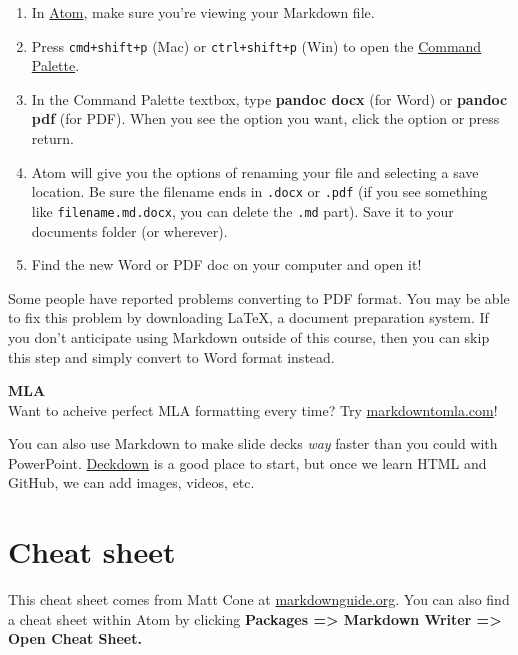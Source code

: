 \documentclass[]{book}
\providecommand{\tightlist}{%
  \setlength{\itemsep}{0pt}\setlength{\parskip}{0pt}}
\theoremstyle{definition}
\theoremstyle{definition}
\theoremstyle{definition}
\theoremstyle{remark}
\begin{document}
\begin{enumerate}
\def\labelenumi{\arabic{enumi}.}
\tightlist
\item
  In \href{https://andylaut.github.io/3844-guidebook/atom.htm}{Atom},
  make sure you're viewing your Markdown file.
\item
  Press \texttt{cmd+shift+p} (Mac) or \texttt{ctrl+shift+p} (Win) to
  open the
  \href{https://andylaut.github.io/3844-guidebook/atom.html\#command-palette}{Command
  Palette}.
\item
  In the Command Palette textbox, type \textbf{pandoc docx} (for Word)
  or \textbf{pandoc pdf} (for PDF). When you see the option you want,
  click the option or press return.
\item
  Atom will give you the options of renaming your file and selecting a
  save location. Be sure the filename ends in \texttt{.docx} or
  \texttt{.pdf} (if you see something like \texttt{filename.md.docx},
  you can delete the \texttt{.md} part). Save it to your documents
  folder (or wherever).
\item
  Find the new Word or PDF doc on your computer and open it!
\end{enumerate}

Some people have reported problems converting to PDF format. You may be
able to fix this problem by downloading LaTeX, a document preparation
system. If you don't anticipate using Markdown outside of this course,
then you can skip this step and simply convert to Word format instead.

\textbf{MLA}\\
Want to acheive perfect MLA formatting every time? Try
\href{http://markdowntomla.com/}{markdowntomla.com}!

You can also use Markdown to make slide decks \emph{way} faster than you
could with PowerPoint. \href{http://deckdown.org/}{Deckdown} is a good
place to start, but once we learn HTML and GitHub, we can add images,
videos, etc.

\hypertarget{cheat-sheet}{%
\section{Cheat sheet}\label{cheat-sheet}}

This cheat sheet comes from Matt Cone at
\href{https://www.markdownguide.org/cheat-sheet/}{markdownguide.org}.
You can also find a cheat sheet within Atom by clicking \textbf{Packages
=\textgreater{} Markdown Writer =\textgreater{} Open Cheat Sheet.}
\end{document}
